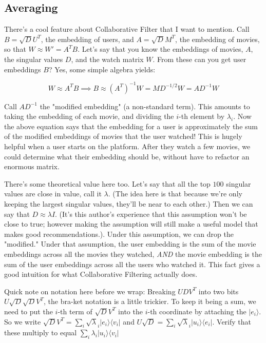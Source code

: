 \documentclass{amsbook}
\begin{document}
\subsection{Averaging}

There's a cool feature about Collaborative Filter that I want to mention.  Call $B=\sqrt DU^T$, the embedding of users, and $A=\sqrt DM^T$, the embedding of movies, so that $W\approx W'=A^TB$.  Let's say that you know the embeddings of movies, $A$, the singular values $D$, and the watch matrix $W$.  From these can you get user embeddings $B$?  Yes, some simple algebra yields:

$$
W\approx A^TB \implies B\approx\left(A^T\right)^{-1}W=MD^{-1/2}W=AD^{-1}W
$$

Call $AD^{-1}$ the "modified embedding" (a non-standard term).  This amounts to taking the embedding of each movie, and dividing the $i$-th element by $\lambda_i$.  Now the above equation says that the embedding for a user is approximately the sum of the modified embeddings of movies that the user watched!  This is hugely helpful when a user starts on the platform.  After they watch a few movies, we could determine what their embedding should be, without have to refactor an enormous matrix.

There's some theoretical value here too.  Let's say that all the top $100$ singular values are close in value, call it $\lambda$.  (The idea here is that because we're only keeping the largest singular values, they'll be near to each other.)  Then we can say that $D\approx\lambda I$.  (It's this author's experience that this assumption won't be close to true; however making the assumption will still make a useful model that makes good recommendations.). Under this assumption, we can drop the "modified."  Under that assumption, the user embedding is the sum of the movie embeddings across all the movies they watched, {\em AND} the movie embedding is the sum of the user embeddings across all the users who watched it.  This fact gives a good intuition for what Collaborative Filtering actually does.

Quick note on notation here before we wrap:  Breaking $UDV^T$ into two bits $U\sqrt D\sqrt DV^T$, the bra-ket notation is a little trickier.  To keep it being a sum, we need to put the $i$-th term of $\sqrt DV^T$ into the $i$-th coordinate by attaching the $|e_i\rangle$.  So we write $\sqrt DV^T=\sum_i\sqrt\lambda_i|e_i\rangle\langle v_i|$ and $U\sqrt D=\sum_i\sqrt\lambda_i|u_i\rangle\langle e_i|$.  Verify that these multiply to equal $\sum_i\lambda_i|u_i\rangle\langle v_i|$
\end{document}
